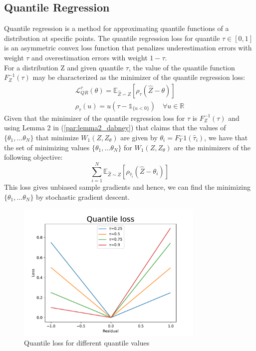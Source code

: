 \subsection{Quantile Regression}
Quantile regression is a method for approximating quantile functions of a distribution at specific points.
The quantile regression loss for quantile $\tau \in [0,1]$ is an asymmetric convex loss function
that penalizes underestimation errors with weight $\tau$ and overestimation errors
with weight $1-\tau$. \\
For a distribution Z and given quantile $\tau$, the value of the quantile function $F_Z^{-1}(\tau)$
may be characterized as the minimizer of the quantile regression loss:
\begin{align}
    \mathcal{L}_{QR}^{\tau}(\theta)=\mathbb E_{\hat{Z}\backsim Z}[\rho_\tau(\hat{Z}-\theta) ] \label{eq:quantile_loss}\\
    \rho_\tau(u)=u(\tau - \mathds{1}_{\{u<0\}}) \quad \forall u \in \mathbb{R} \nonumber
\end{align}
Given that the minimizer of the quantile regression loss for $\tau$ is $F_Z^{-1}(\tau)$ and 
using Lemma 2 in \citet{Dabney2018a} (\ref{par:lemma2_dabney}) that claims that the values 
of $\{\theta_1, ... \theta_N\}$ that minimize
 $W_1(Z,Z_\theta)$ are given by $\theta_i = F_Y^-1(\hat\tau_i)$, we have that the set of minimizing
 values $\{\theta_1, ... \theta_N\}$ for  $W_1(Z,Z_\theta)$ are the minimizers of the 
 following objective:
\begin{equation}
    \sum_{i=1}^{N} \mathbb E_{\hat{Z} \sim Z} [ \rho_{\hat\tau_i}(\hat{Z}-\theta_i)]
\end{equation}
This loss gives unbiased sample gradients and hence, we can find the minimizing $\{\theta_1, ... \theta_N\}$
by stochastic gradient descent.

\begin{figure}[ht] 
    \centering
    \includegraphics[width=0.8\textwidth]{images/quantile_loss.pdf}
    \caption{Quantile loss for different quantile values}
    \label{fig:quantile_loss}
\end{figure}

